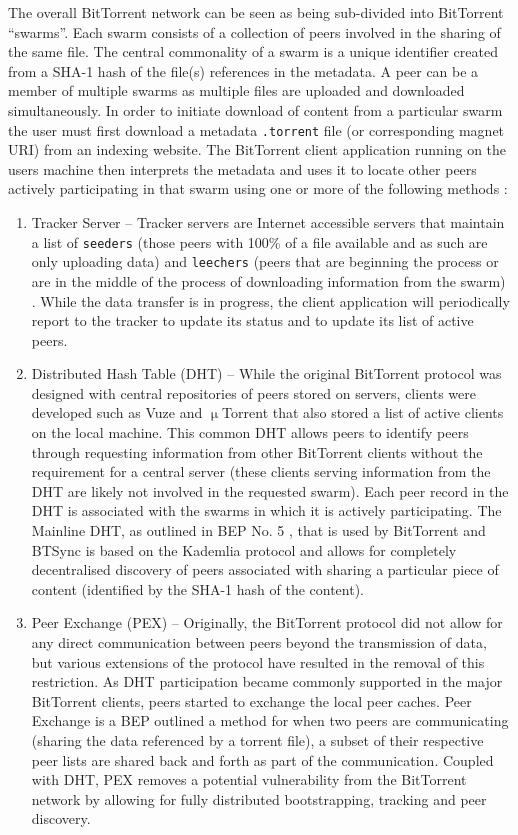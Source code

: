 \documentclass[final,5p,times,twocolumn]{elsarticle}
\begin{document}
The overall BitTorrent network can be seen as being sub-divided into BitTorrent ``swarms''. Each swarm consists of a collection of peers involved in the sharing of the same file. The central commonality of a swarm is a unique identifier created from a SHA-1 hash of the file(s) references in the metadata. A peer can be a member of multiple swarms as multiple files are uploaded and downloaded simultaneously. In order to initiate download of content from a particular swarm the user must first download a metadata \texttt{.torrent} file (or corresponding magnet URI) from an indexing website. The BitTorrent client application running on the users machine then interprets the metadata and uses it to locate other peers actively participating in that swarm using one or more of the following methods \cite{scanlon2010week}: 


\begin{enumerate}
\item Tracker Server -- Tracker servers are Internet accessible servers that maintain a list of \texttt{seeders} (those peers with 100\% of a file available and as such are only uploading data) and \texttt{leechers} (peers that are beginning the process or are in the middle of the process of downloading information from the swarm) \cite{cohen2003incentives}. While the data transfer is in progress, the client application will periodically report to the tracker to update its status and to update its list of active peers.
\item Distributed Hash Table (DHT) -- While the original BitTorrent protocol was designed with central repositories of peers stored on servers, clients were developed such as Vuze and $\upmu$Torrent that also stored a list of active clients on the local machine. This common DHT allows peers to identify peers through requesting information from other BitTorrent clients without the requirement for a central server (these clients serving information from the DHT are likely not involved in the requested swarm). Each peer record in the DHT is associated with the swarms in which it is actively participating. The Mainline DHT, as outlined in BEP No. 5 \cite{cohen2008bittorrent}, that is used by BitTorrent and BTSync is based on the Kademlia protocol and allows for completely decentralised discovery of peers associated with sharing a particular piece of content (identified by the SHA-1 hash of the content).
\item Peer Exchange (PEX) -- Originally, the BitTorrent protocol did not allow for any direct communication between peers beyond the transmission of data, but various extensions of the protocol have resulted in the removal of this restriction. As DHT participation became commonly supported in the major BitTorrent clients, peers started to exchange the local peer caches. Peer Exchange is a BEP outlined a method for when two peers are communicating (sharing the data referenced by a torrent file), a subset of their respective peer lists are shared back and forth as part of the communication. Coupled with DHT, PEX removes a potential vulnerability from the BitTorrent network by allowing for fully distributed bootstrapping, tracking and peer discovery. 
\end{enumerate}
\end{document}
